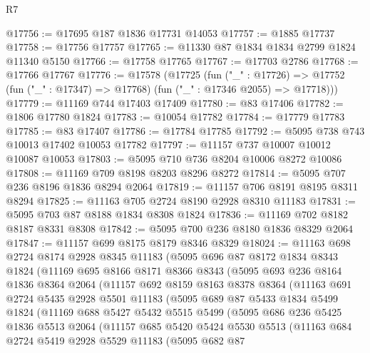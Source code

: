 \begin{lexlean}{R7}
\begin{coremodule}
@17756 := @17695 @187 @1836 @17731 @14053
@17757 := @1885 @17737
@17758 := @17756 @17757
@17765 := @11330 @87 @1834 @1834 @2799 @1824 @11340 @5150
@17766 := @17758 @17765
@17767 := @17703 @2786
@17768 := @17766 @17767
@17776 := @17578
    (@17725
      (fun ("_" : @17726) =>
      @17752 (fun ("_" : @17347) => @17768) (fun ("_" : @17346 @2055) => @17718)))
@17779 := @11169 @744 @17403 @17409
@17780 := @83 @17406
@17782 := @1806 @17780 @1824
@17783 := @10054 @17782
@17784 := @17779 @17783
@17785 := @83 @17407
@17786 := @17784 @17785
@17792 := @5095 @738 @743 @10013 @17402 @10053 @17782
@17797 := @11157 @737 @10007 @10012 @10087 @10053
@17803 := @5095 @710 @736 @8204 @10006 @8272 @10086
@17808 := @11169 @709 @8198 @8203 @8296 @8272
@17814 := @5095 @707 @236 @8196 @1836 @8294 @2064
@17819 := @11157 @706 @8191 @8195 @8311 @8294
@17825 := @11163 @705 @2724 @8190 @2928 @8310 @11183
@17831 := @5095 @703 @87 @8188 @1834 @8308 @1824
@17836 := @11169 @702 @8182 @8187 @8331 @8308
@17842 := @5095 @700 @236 @8180 @1836 @8329 @2064
@17847 := @11157 @699 @8175 @8179 @8346 @8329
@18024 := @11163
    @698
    @2724
    @8174
    @2928
    @8345
    @11183
    (@5095
      @696
      @87
      @8172
      @1834
      @8343
      @1824
      (@11169
        @695
        @8166
        @8171
        @8366
        @8343
        (@5095
          @693
          @236
          @8164
          @1836
          @8364
          @2064
          (@11157
            @692
            @8159
            @8163
            @8378
            @8364
            (@11163
              @691
              @2724
              @5435
              @2928
              @5501
              @11183
              (@5095
                @689
                @87
                @5433
                @1834
                @5499
                @1824
                (@11169
                  @688
                  @5427
                  @5432
                  @5515
                  @5499
                  (@5095
                    @686
                    @236
                    @5425
                    @1836
                    @5513
                    @2064
                    (@11157
                      @685
                      @5420
                      @5424
                      @5530
                      @5513
                      (@11163
                        @684
                        @2724
                        @5419
                        @2928
                        @5529
                        @11183
                        (@5095
                          @682
                          @87

\end{coremodule}
\end{lexlean}
